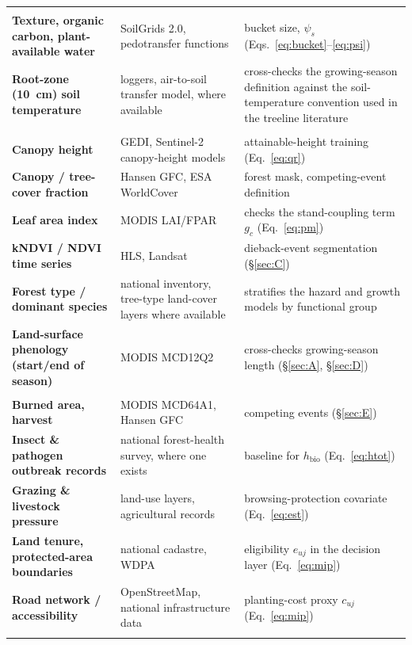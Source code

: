 \begin{xltabular}{\linewidth}{@{}>{\raggedright\arraybackslash\bfseries\sffamily}p{3.4cm}>{\raggedright\arraybackslash}p{4.3cm}>{\raggedright\arraybackslash}X@{}}
\\
Texture, organic carbon, plant-available water & SoilGrids 2.0, pedotransfer functions & bucket size, $\psi_s$ (Eqs.~\eqref{eq:bucket}--\eqref{eq:psi})\\
Root-zone (10~cm) soil temperature & loggers, air-to-soil transfer model, where available & cross-checks the growing-season definition against the soil-temperature convention used in the treeline literature\\
\\
Canopy height & GEDI, Sentinel-2 canopy-height models & attainable-height training (Eq.~\eqref{eq:qr})\\
Canopy / tree-cover fraction & Hansen GFC, ESA WorldCover & forest mask, competing-event definition\\
Leaf area index & MODIS LAI/FPAR & checks the stand-coupling term $g_c$ (Eq.~\eqref{eq:pm})\\
kNDVI / NDVI time series & HLS, Landsat & dieback-event segmentation (\S\ref{sec:C})\\
Forest type / dominant species & national inventory, tree-type land-cover layers where available & stratifies the hazard and growth models by functional group\\
Land-surface phenology (start/end of season) & MODIS MCD12Q2 & cross-checks growing-season length (\S\ref{sec:A}, \S\ref{sec:D})\\
\\
Burned area, harvest & MODIS MCD64A1, Hansen GFC & competing events (\S\ref{sec:E})\\
Insect \& pathogen outbreak records & national forest-health survey, where one exists & baseline for $h_{\text{bio}}$ (Eq.~\eqref{eq:htot})\\
Grazing \& livestock pressure & land-use layers, agricultural records & browsing-protection covariate (Eq.~\eqref{eq:est})\\
Land tenure, protected-area boundaries & national cadastre, WDPA & eligibility $e_{uj}$ in the decision layer (Eq.~\eqref{eq:mip})\\
Road network / accessibility & OpenStreetMap, national infrastructure data & planting-cost proxy $c_{uj}$ (Eq.~\eqref{eq:mip})\\
\\

\end{xltabular}
